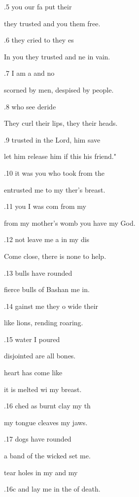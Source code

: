.5  you our fa put their  

they trusted and you  them free. 

.6  they cried to  they es 

In you they trusted and ne in vain. 

.7  I am a  and no  

scorned by men, despised by  people. 

.8  who see  deride  

They curl their lips, they  their heads. 

.9  trusted in the Lord,  him save  

let him release him if this  his friend." 

.10  it was you who took  from the  

entrusted me to my ther's breast. 

.11  you I was com from my  

from my mother's womb you have  my God. 

.12  not leave me a in my dis 

Come close, there is none  to help. 

.13  bulls have rounded  

fierce bulls of Bashan  me in. 

.14 gainst me they o wide their  

like lions, rending  roaring. 

.15  water I  poured  

disjointed are all  bones. 

 heart has come like  

it is melted wi my breast. 

.16 ched as burnt clay  my th 

my tongue cleaves  my jaws. 

.17  dogs have rounded  

a band of the wicked set me. 

 tear holes in my  and my  

.16c and lay me in the  of death. 

